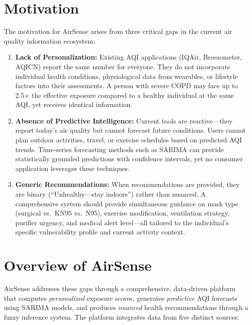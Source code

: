 \documentclass[12pt,a4paper]{report}
\begin{document}
\section{Motivation}

The motivation for AirSense arises from three critical gaps in the current air quality information ecosystem:

\begin{enumerate}[leftmargin=*]
  \item \textbf{Lack of Personalization:} Existing AQI applications (IQAir, Breezometer, AQICN) report the same number for everyone. They do not incorporate individual health conditions, physiological data from wearables, or lifestyle factors into their assessments. A person with severe COPD may face up to 2.5$\times$ the effective exposure compared to a healthy individual at the same AQI, yet receives identical information.

  \item \textbf{Absence of Predictive Intelligence:} Current tools are reactive---they report today's air quality but cannot forecast future conditions. Users cannot plan outdoor activities, travel, or exercise schedules based on predicted AQI trends. Time-series forecasting methods such as SARIMA can provide statistically grounded predictions with confidence intervals, yet no consumer application leverages these techniques.

  \item \textbf{Generic Recommendations:} When recommendations are provided, they are binary (``Unhealthy---stay indoors'') rather than nuanced. A comprehensive system should provide simultaneous guidance on mask type (surgical vs.\ KN95 vs.\ N95), exercise modification, ventilation strategy, purifier urgency, and medical alert level---all tailored to the individual's specific vulnerability profile and current activity context.
\end{enumerate}

\section{Overview of AirSense}

AirSense addresses these gaps through a comprehensive, data-driven platform that computes \textit{personalized} exposure scores, generates \textit{predictive} AQI forecasts using SARIMA models, and produces \textit{nuanced} health recommendations through a fuzzy inference system. The platform integrates data from five distinct sources:
\end{document}
